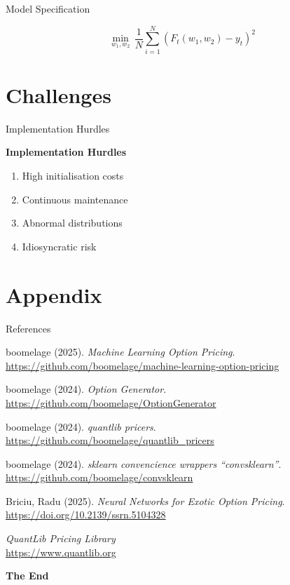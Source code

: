 \documentclass[aspectratio=169,xcolor=dvipsnames]{beamer}
\begin{document}
		\begin{frame}{Model Specification}
			
			\[ \min_{w_{1}, w_{2}} \, \frac{1}{N} \sum_{i=1}^{N} \left(F_{t}(w_{1}, w_{2}) - y_{t}\right)^{2} \]
		\end{frame}
		
	\section{Challenges}
	
		\begin{frame}{Implementation Hurdles}
		\begin{center}
			\huge \textbf{Implementation Hurdles}
		\end{center}
		\vspace{5em}
		\begin{enumerate}
			\item High initialisation costs
			\item Continuous maintenance
			\item Abnormal distributions
			\item Idiosyncratic risk
		\end{enumerate}
		\end{frame}
		
	\section{Appendix}
		\begin{frame}{References}
			\begin{thebibliography}{9}
				
				 boomelage (2025). \emph{Machine Learning Option Pricing}. \\
				\url{https://github.com/boomelage/machine-learning-option-pricing}
				
				 boomelage (2024). \emph{Option Generator}. \\
				\url{https://github.com/boomelage/OptionGenerator}
				
				 boomelage (2024). \emph{quantlib pricers}. \\
				\url{https://github.com/boomelage/quantlib_pricers}
				
				 boomelage (2024). \emph{sklearn convencience wrappers ``convsklearn''}. \\ 
				\url{https://github.com/boomelage/convsklearn}
				
				 Briciu, Radu (2025). \emph{Neural Networks for Exotic Option Pricing}. 
				\url{https://doi.org/10.2139/ssrn.5104328}
				
				 \emph{QuantLib Pricing Library} \\ 
				\url{https://www.quantlib.org}
				
			\end{thebibliography}
		\end{frame}
		
		
		\begin{frame}
			\centering
			\Huge{\textbf{The End}}
		\end{frame}
	
\end{document}
